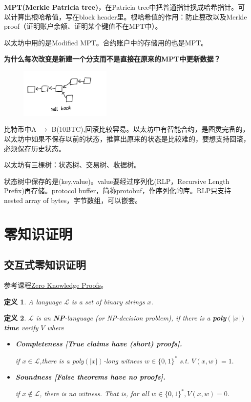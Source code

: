 \documentclass[10pt]{ctexart}
\newtheorem{definition}{定义}
\begin{document}
\textbf{MPT(Merkle Patricia tree)}，在Patricia tree中把普通指针换成哈希指针。可以计算出根哈希值，写在block header里。根哈希值的作用：防止篡改以及Merkle proof（证明账户余额、证明某个键值不在MPT中）。

以太坊中用的是Modified MPT。合约账户中的存储用的也是MPT。

\textbf{为什么每次改变是新建一个分支而不是直接在原来的MPT中更新数据？}
\begin{figure}[H]
    \centering
    \includegraphics[width=0.4\textwidth]{courses/区块链技术与应用/lecture16/img1.png} 
\end{figure}
比特币中A $\rightarrow$ B(10BTC),回滚比较容易。以太坊中有智能合约，是图灵完备的，以太坊中如果不保存以前的状态，推算出原来的状态是比较难的，要想支持回滚，必须保存历史状态。

以太坊有三棵树：状态树、交易树、收据树。

状态树中保存的是(key,value)。value要经过序列化(RLP，Recursive Length Prefix)再存储。protocol buffer，简称protobuf，作序列化的库。RLP只支持nested array of bytes，字节数组，可以嵌套。

 
\section{零知识证明}
\subsection{交互式零知识证明}
参考课程\href{https://zk-learning.org/}{Zero Knowledge Proofs}。
\begin{definition}
	A language $\mathcal{L}$ is a set of binary strings $x$.
\end{definition}
\begin{definition}
	$\mathcal{L}$ is an \textbf{NP}-language (or NP-decision problem), if there is a \textbf{poly$(|x|)$ time} verify $V$ where
	\begin{itemize}
		 \item \textbf{Completeness [True claims have (short) proofs].}
		 
		if $x \in \mathcal{L}$,there is a poly$(|x|)$-long witness $w \in \{0,1\}^*$ s.t. $V(x,w) = 1.$
		\item \textbf{Soundness [False theorems have no proofs].}
		
		if $x \notin \mathcal{L}$, there is no witness. That is, for all $w \in \{0,1\}^*,V(x,w) = 0.$
	\end{itemize}
\end{definition}
\end{document}
